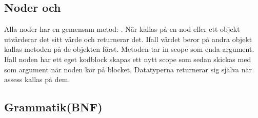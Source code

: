 \documentclass{article}
\begin{document}
\subsection{Noder och }
\begin{flushleft}
Alla noder har en gemensam metod: . När  kallas på en nod eller ett objekt utvärderar det sitt värde och returnerar det. Ifall värdet beror på andra objekt kallas metoden på de objekten först. Metoden tar in scope som enda argument. Ifall noden har ett eget kodblock skapas ett nytt scope som sedan skickas med som argument när noden kör  på blocket. Datatyperna returnerar sig själva när assess kallas på dem. 
\end{flushleft}
\newpage
\subsection{Grammatik(BNF)}
\end{document}
